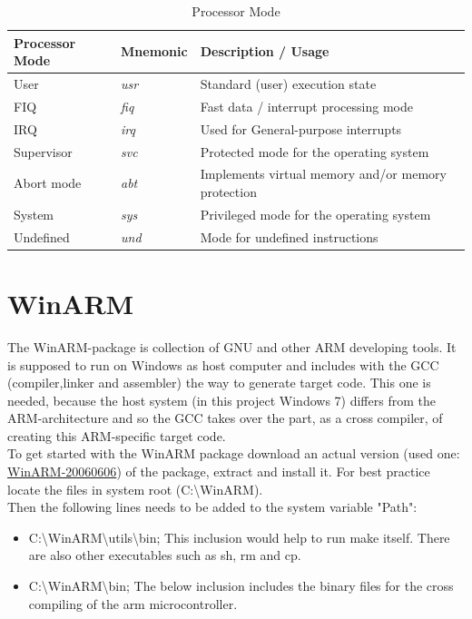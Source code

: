 \begin{table}[H]
\begin{tabular}{lll} %
\textbf{Processor Mode} &\textbf{Mnemonic}	 &\textbf{Description / Usage}  \\
\hline
\hline
  User&\textit{usr}& Standard (user) execution state\\
  FIQ&\textit{fiq}& Fast data / interrupt processing mode\\
  IRQ&\textit{irq}& Used for General-purpose interrupts\\
  Supervisor&\textit{svc}& Protected mode for the operating system\\
  Abort mode&\textit{abt}& Implements virtual memory and/or memory protection\\
  System&\textit{sys}& Privileged mode for the operating system\\
  Undefined&\textit{und}& Mode for undefined instructions\\

\end{tabular}
\caption[Processor Mode]{Processor Mode \cite{AT91Overview}\cite{AT91RTC}\cite{UNISTG}}
\label{tab:cpuMode}
\end{table}








\section{WinARM}
The WinARM-package is collection of GNU and other ARM developing tools. It is supposed to run on Windows as host computer and includes with the GCC (compiler,linker and assembler) the way to generate target code. This one is needed, because the host system (in this project Windows 7) differs from the ARM-architecture and so the GCC takes over the part, as a cross compiler, of creating this ARM-specific target code.\\
To get started with the WinARM package download an actual version (used one: \href{http://www.siwawi.arubi.uni-kl.de/avr_projects/arm_projects/WinARM-20060606.exe}{WinARM-20060606}) of the package, extract and install it. For best practice locate the files in system root (C:\textbackslash WinARM).\\
Then the following lines needs to be added to the system variable "Path":
\begin{itemize}
	\item C:\textbackslash WinARM\textbackslash utils\textbackslash bin; 	This inclusion would help to run make itself. There are also other executables such as sh, rm and cp.
	\item C:\textbackslash WinARM\textbackslash bin; The below inclusion includes the binary files for the cross compiling of the arm microcontroller.
\end{itemize}

